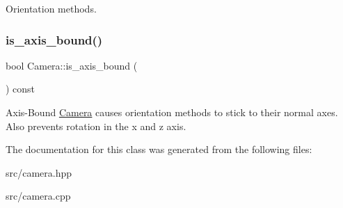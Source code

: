 Orientation methods. \mbox{\label{class_camera_a2c0432bd7e7e47d0e90d0fdf7d99a798}} 
\subsubsection{\texorpdfstring{is\+\_\+axis\+\_\+bound()}{is\_axis\_bound()}}
{\footnotesize\ttfamily bool Camera\+::is\+\_\+axis\+\_\+bound (\begin{DoxyParamCaption}{ }\end{DoxyParamCaption}) const}

Axis-\/\+Bound \mbox{\hyperlink{class_camera}{Camera}} causes orientation methods to stick to their normal axes. Also prevents rotation in the x and z axis. 

The documentation for this class was generated from the following files\+:\begin{DoxyCompactItemize}
\item 
src/camera.\+hpp\item 
src/camera.\+cpp\end{DoxyCompactItemize}
